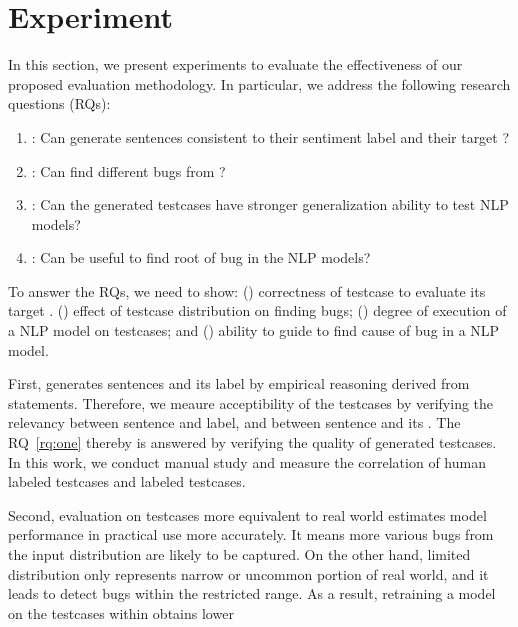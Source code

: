 \section{Experiment}
\label{sec:experiment}
%


In this section, we present experiments to evaluate the effectiveness
of our proposed evaluation methodology. In particular, we address the
following research questions (RQs):

\begin{enumerate}[label=\textbf{RQ\arabic*}]
\item \label{rq:one}: Can \tool generate sentences consistent to their
  sentiment label and their target \lc?
\item \label{rq:two}: Can \tool find different bugs from \Cklst?
\item \label{rq:three}: Can the \tool generated testcases have stronger
  generalization ability to test NLP models?
\item \label{rq:four}: Can \tool be useful to find root of bug in the
  NLP models?
\end{enumerate}

To answer the RQs, we need to show: () correctness of testcase to
evaluate its target \lc.  () effect of testcase distribution on
finding bugs; () degree of execution of a NLP model on testcases;
and () ability to guide to find cause of bug in a NLP
model.

First, \tool generates sentences and its label by empirical reasoning
derived from \lc statements. Therefore, we meaure acceptibility of the
testcases by verifying the relevancy between sentence and label, and
between sentence and its \lc. The RQ~\ref{rq:one} thereby is answered
by verifying the quality of generated testcases. In this work, we
conduct manual study and measure the correlation of human labeled
testcases and \tool labeled testcases.

Second, evaluation on testcases more equivalent to real world
estimates model performance in practical use more accurately. It means
more various bugs from the input distribution are likely to be
captured.  On the other hand, limited distribution only represents
narrow or uncommon portion of real world, and it leads to detect bugs
within the restricted range. As a result, retraining a model on the
testcases within  obtains lower 

